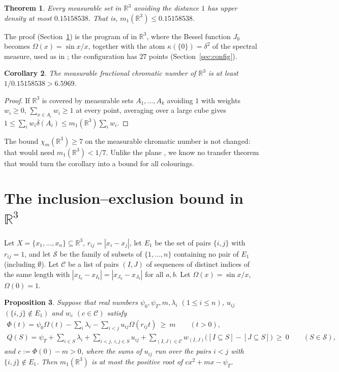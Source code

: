 \documentclass[11pt,a4paper]{amsart}
\newtheorem{theorem}{Theorem}
\newtheorem{corollary}[theorem]{Corollary}
\newtheorem{proposition}[theorem]{Proposition}
\theoremstyle{remark}
\newcommand{\R}{\mathbb{R}}
\newcommand{\NPTS}{27}
\newcommand{\MONE}{0.15158538}
\newcommand{\INVM}{6.5969}
\begin{document}
\begin{theorem}\label{thm:main}
Every measurable set in $\R^3$ avoiding the distance $1$ has upper density at most $\MONE$. That is,
$m_1(\R^3)\le\MONE$.
\end{theorem}

The proof (Section~\ref{sec:ie}) is the program of \cite{ACMVZ} in $\R^3$, where the Bessel function $J_0$ becomes
$\Omega(x)=\sin x/x$, together with the atom $\kappa(\{0\})=\delta^2$ of the spectral measure, used as in
\cite[Prop.~3.5]{KMOR}; the configuration has $\NPTS$ points (Section~\ref{sec:config}).

\begin{corollary}
The measurable fractional chromatic number of $\R^3$ is at least $1/\MONE>\INVM$.
\end{corollary}

\begin{proof}
If $\R^3$ is covered by measurable sets $A_1,\dots,A_k$ avoiding $1$ with weights $w_i\ge0$, $\sum_{x\in A_i}w_i\ge1$ at
every point, averaging over a large cube gives $1\le\sum_iw_i\overline\delta(A_i)\le m_1(\R^3)\sum_iw_i$.
\end{proof}

The bound $\chi_m(\R^3)\ge7$ on the measurable chromatic number \cite{OFV} is not changed: that would need
$m_1(\R^3)<1/7$. Unlike the plane \cite{Galan}, we know no transfer theorem that would turn the corollary into a bound
for all colourings.

\section{The inclusion--exclusion bound in $\R^3$}\label{sec:ie}

Let $X=\{x_1,\dots,x_n\}\subseteq\R^3$, $r_{ij}=|x_i-x_j|$, let $E_1$ be the set of pairs $\{i,j\}$ with $r_{ij}=1$, and
let $\mathcal S$ be the family of subsets of $\{1,\dots,n\}$ containing no pair of $E_1$ (including $\emptyset$). Let
$\mathcal C$ be a list of pairs $(I,J)$ of sequences of distinct indices of the same length with
$|x_{I_a}-x_{I_b}|=|x_{J_a}-x_{J_b}|$ for all $a,b$. Let $\Omega(x)=\sin x/x$, $\Omega(0)=1$.

\begin{proposition}\label{prop:ie}
Suppose that real numbers $\psi_0,\psi_T,m,\lambda_i$ $(1\le i\le n)$, $u_{ij}$ $(\{i,j\}\notin E_1)$ and $w_c$
$(c\in\mathcal C)$ satisfy
\begin{gather*}
\Phi(t)=\psi_0\Omega(t)-\sum_i\lambda_i-\sum_{i<j}u_{ij}\Omega(r_{ij}t)\ \ge\ m\qquad(t>0),\\
Q(S)=\psi_T+\sum_{i\in S}\lambda_i+\sum_{i<j,\ i,j\in S}u_{ij}+\sum_{(I,J)\in\mathcal C}w_{(I,J)}\bigl([I\subseteq S]-[J\subseteq S]\bigr)
\ \ge\ 0\qquad(S\in\mathcal S),
\end{gather*}
and $c:=\Phi(0)-m>0$, where the sums of $u_{ij}$ run over the pairs $i<j$ with $\{i,j\}\notin E_1$. Then $m_1(\R^3)$ is at
most the positive root of $cx^2+mx-\psi_T$.
\end{proposition}
\end{document}
